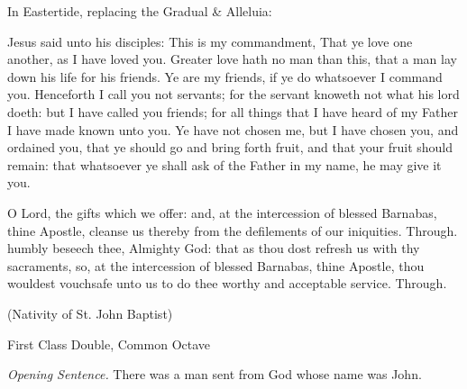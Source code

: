 
\clearpage
\begin{rubric}
{In Eastertide, replacing the Gradual \& Alleluia:}
\end{rubric}


 Jesus said unto his disciples: This is my commandment, That ye love one another, as I have loved you. Greater love hath no man than this, that a man lay down his life for his friends. Ye are my friends, if ye do whatsoever I command you. Henceforth I call you not servants; for the servant knoweth not what his lord doeth: but I have called you friends; for all things that I have heard of my Father I have made known unto you. Ye have not chosen me, but I have chosen you, and ordained you, that ye should go and bring forth fruit, and that your fruit should remain: that whatsoever ye shall ask of the Father in my name, he may give it you.

\secret
{} O Lord, the gifts which we offer: and, at the intercession of blessed Barnabas, thine Apostle, cleanse us thereby from the defilements of our iniquities. Through.
\postcommunion
{} humbly beseech thee, Almighty God: that as thou dost refresh us with thy sacraments, so, at the intercession of blessed Barnabas, thine Apostle, thou wouldest vouchsafe unto us to do thee worthy and acceptable service. Through.


\clearpage
{}\label{StJohnBaptist}

\centerline{\small{(Nativity of St. John Baptist)}}

\begin{inhead}
    {First Class Double, Common Octave}
\end{inhead}
\par\noindent
\textit{Opening Sentence.} There was a man sent from God whose name was John.

